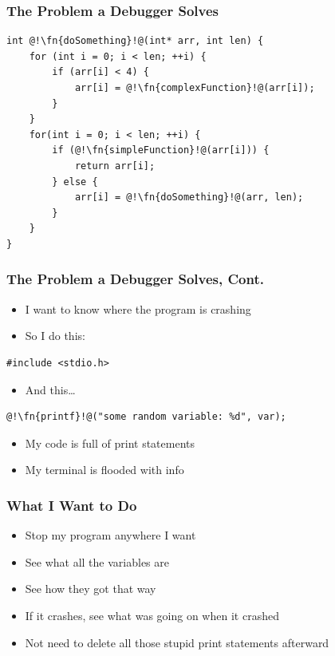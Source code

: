 \documentclass{beamer}
\newcommand{\fn}{\color{identifier}}
\begin{document}
\begin{frame}[fragile]
    \frametitle{The Problem a Debugger Solves}
    \begin{lstlisting}
int @!\fn{doSomething}!@(int* arr, int len) {
    for (int i = 0; i < len; ++i) {
        if (arr[i] < 4) {
            arr[i] = @!\fn{complexFunction}!@(arr[i]);
        }
    }
    for(int i = 0; i < len; ++i) {
        if (@!\fn{simpleFunction}!@(arr[i])) {
            return arr[i];
        } else {
            arr[i] = @!\fn{doSomething}!@(arr, len);
        }
    }
}
    \end{lstlisting}

\end{frame}
\begin{frame}[fragile]
    \frametitle{The Problem a Debugger Solves, Cont.}
    \begin{itemize}
        \item I want to know where the program is crashing
        \item So I do this:
    \end{itemize}
    \begin{lstlisting}[numbers=none]
#include <stdio.h>
    \end{lstlisting}
    \begin{itemize}
        \item And this\dots
    \end{itemize}
    \begin{lstlisting}[numbers=none]
@!\fn{printf}!@("some random variable: %d", var);
    \end{lstlisting}
    \begin{itemize}
        \item My code is full of print statements
        \item My terminal is flooded with info
    \end{itemize}


\end{frame}
\begin{frame}
    \frametitle{What I Want to Do}

    \begin{itemize}
        \item Stop my program anywhere I want
        \item See what all the variables are
        \item See how they got that way
        \item If it crashes, see what was going on when it crashed
        \item Not need to delete all those stupid print statements afterward
    \end{itemize}

\end{frame}
\end{document}
